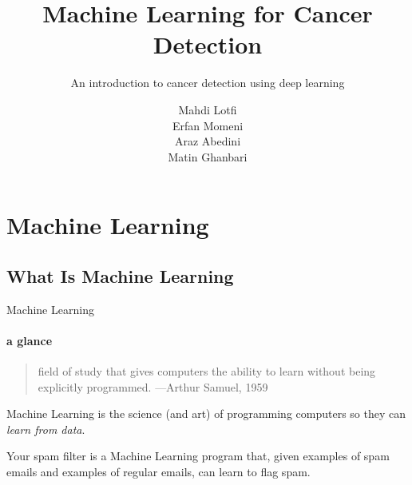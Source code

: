 \documentclass{beamer}
\title{Machine Learning for Cancer Detection} %
\subtitle{An introduction to cancer detection using deep learning} %
\author{Mahdi Lotfi \\ Erfan Momeni \\ Araz Abedini \\ Matin Ghanbari}
\begin{document}
  \frame[c]{\maketitle}

    \section{Machine Learning}
    \subsection{What Is Machine Learning}
    \begin{frame}[t]{Machine Learning}
      \framesubtitle{a glance}%
      \begin{quote}
        field of study that gives computers the ability to learn without being explicitly programmed.
        \hfill {\tiny —Arthur Samuel, 1959}
      \end{quote}
      Machine Learning is the science (and art) of programming computers so they can \textit{learn from data}. \\
      \vspace{8mm}
      \parbox{0.55\textwidth}{
      Your spam filter is a Machine Learning program that, given examples of spam emails and examples of regular emails, can learn to flag spam.
      }
    \end{frame}
\end{document}
